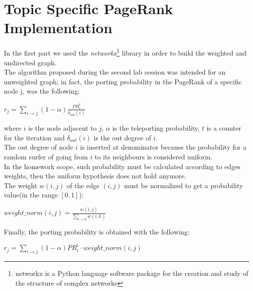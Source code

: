 \documentclass[11pt]{article}
\begin{document}
\section{Topic Specific PageRank Implementation}
In the first part we used the \textit{networkx}\footnote{networkx is a Python language software package for the creation
and study of the structure of complex networks} library in order to build the weighted and undirected graph.\\
The algorithm proposed during the second lab session was intended for an unweighted graph; in fact, the porting probability in the PageRank of a specific node j, was the following:\\
\begin{center}
$ r_j =\sum_{i\rightarrow j}(1-\alpha) \frac{PR_{i}^{t}}{\delta_{out}(i)}$
\end{center}
where $i$ is the node adjacent to $j$, $\alpha$ is the teleporting probability, $t$ is a counter for the
iteration and $\delta_{out}(i)$ is the out degree of $i$.\\
The out degree of node $i$ is inserted at denominator because the probability for a random surfer
of going from $i$ to its neighbours is considered uniform.\\
In the homework scope, such probability must be calculated according to edges weights, then
the uniform hypothesis does not hold anymore.\\
The weight $w(i,j)$ of the edge $(i,j)$ must be normalized to get a probability value(in the
range $[0,1]$):\\
\begin{center}
$weight\_norm(i,j) = \frac{w(i,j)}{\sum_{i\rightarrow k}w(i,k)}$\\
\end{center}
Finally, the porting probability is obtained with the following:\\
\begin{center}
$ r_j =\sum_{i\rightarrow j}(1-\alpha)PR_{i}^{t} \cdot weight\_norm(i,j)$\\
\end{center}
\end{document}
